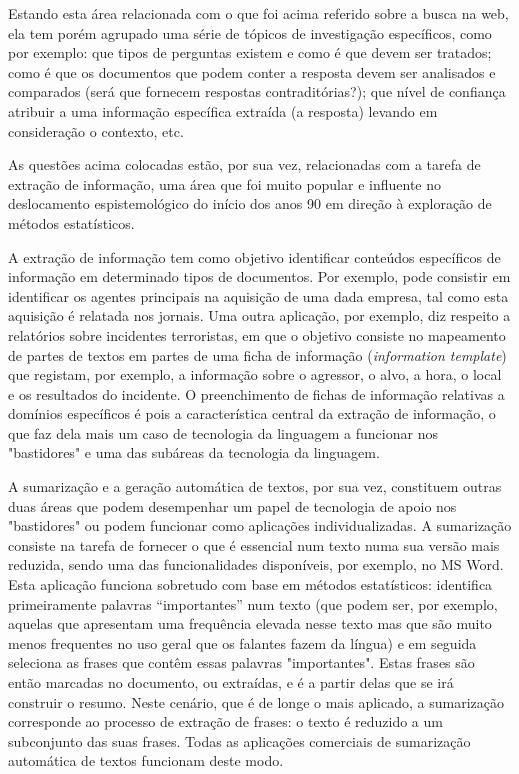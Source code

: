 \begin{multicols}{2}
Estando esta área relacionada com o que foi acima referido sobre a busca na web, 
ela tem porém agrupado uma série de tópicos de investigação específicos, como por exemplo: 
que tipos de perguntas existem e como é que devem ser tratados; 
como é que os documentos que podem conter a resposta devem ser analisados e comparados 
(será que fornecem respostas contraditórias?); 
que nível de confiança atribuir a uma informação específica extraída (a resposta)  levando
em consideração o contexto, etc.

As questões acima colocadas estão, por sua vez, relacionadas com a tarefa de extração de informação, 
uma área que foi muito popular e influente no deslocamento espistemológico do início dos anos 90 em
direção à exploração de métodos estatísticos. 

A extração de informação tem como objetivo identificar conteúdos específicos de informação 
em determinado tipos de documentos. Por exemplo, pode consistir em identificar os agentes 
principais na aquisição de uma dada empresa, tal como esta aquisição é relatada nos jornais. 
Uma outra aplicação, por exemplo, diz respeito a relatórios sobre incidentes terroristas, 
em que o objetivo consiste no mapeamento de partes de textos
em partes de uma ficha de informação (\textit{information template}) que registam, por exemplo,
a informação sobre o agressor, o alvo, a hora, o local e os resultados do incidente. 
O preenchimento de fichas de informação relativas a domínios específicos
é pois a característica central da extração de informação, o que faz dela mais um caso
de tecnologia da linguagem a funcionar nos "bastidores" e uma das subáreas
da tecnologia da linguagem.

A sumarização e a geração automática de textos, por sua vez, constituem outras duas
áreas que podem desempenhar um papel de tecnologia de apoio nos "bastidores"
ou podem funcionar como aplicações individualizadas. 
A sumarização consiste na tarefa de fornecer o que é essencial num texto
numa sua versão mais reduzida, sendo uma das funcionalidades disponíveis, por exemplo, 
no MS Word. 
Esta aplicação funciona sobretudo com base em métodos estatísticos: identifica primeiramente palavras 
“importantes” num texto (que podem ser, por exemplo, aquelas que apresentam uma frequência 
elevada nesse texto mas que são muito menos frequentes no uso geral que os falantes fazem da língua) e em seguida seleciona 
as frases que contêm essas palavras "importantes". Estas frases são então marcadas no documento, ou extraídas, 
e é a partir delas que se irá construir o resumo. Neste cenário, que é de longe o mais aplicado, a sumarização cor\-res\-pon\-de 
ao processo de extração de frases: o texto é reduzido a um subconjunto das suas frases. 
Todas as aplicações comerciais de sumarização automática de textos funcionam deste modo. 


\end{multicols}
